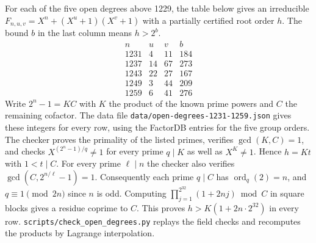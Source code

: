 \documentclass[11pt]{article}
\newcommand{\ord}{\operatorname{ord}}
\begin{document}
For each of the five open degrees above 1229, the table below gives
an irreducible \(F_{n,u,v}=X^n+(X^u+1)(X^v+1)\) with a partially
certified root order \(h\). The bound \(b\) in the last column means
\(h>2^b\).
\[
\begin{array}{r|r|r|r}
n&u&v&b\\ \hline
1231&4&11&184\\
1237&14&67&273\\
1243&22&27&167\\
1249&3&44&209\\
1259&6&41&276
\end{array}
\]
Write \(2^n-1=KC\) with \(K\) the product of the known prime powers
and \(C\) the remaining cofactor. The data file
\nolinkurl{data/open-degrees-1231-1259.json} gives these integers
for every row, using the FactorDB entries for the five group orders.
The checker proves the primality of the listed primes, verifies
\(\gcd(K,C)=1\), and checks \(X^{(2^n-1)/q}\ne1\) for every prime
\(q\mid K\) as well as \(X^K\ne1\). Hence \(h=Kt\) with
\(1<t\mid C\). For every prime \(\ell\mid n\) the checker also
verifies \(\gcd(C,2^{n/\ell}-1)=1\). Consequently each prime
\(q\mid C\) has \(\ord_q(2)=n\), and \(q\equiv1\pmod{2n}\) since
\(n\) is odd. Computing
\(
\prod_{j=1}^{2^{32}}(1+2nj)\bmod C
\)
in square blocks gives a residue coprime to \(C\). This proves
\(h>K(1+2n\cdot2^{32})\) in every row.
\nolinkurl{scripts/check_open_degrees.py} replays the field checks
and recomputes the products by Lagrange interpolation.
\end{document}
